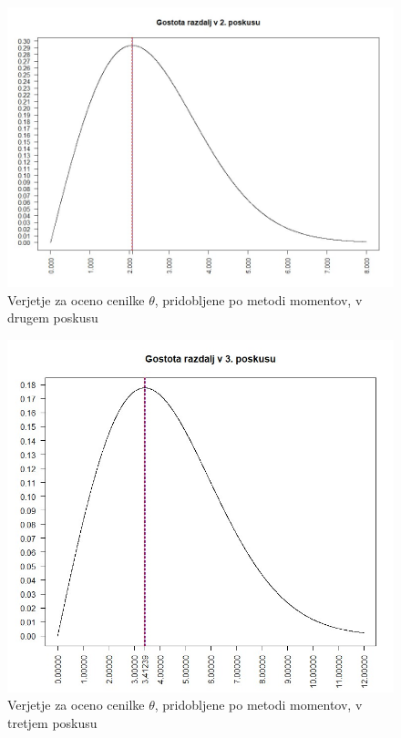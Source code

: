 \documentclass[a4paper, 10pt]{article}
\begin{document}
	\begin{figure}[h!]
		\label{fig: 2Eplot2}
		\centering
		\includegraphics[scale = 0.325]{VerjetjeMM2}
		\caption{Verjetje za oceno cenilke $\theta$, pridobljene po metodi momentov, v drugem poskusu}
	\end{figure}
	
	\begin{figure}[h!]
		\label{fig: 2Eplot3}
		\centering
		\includegraphics[scale = 0.35]{VerjetjeMM3}
		\caption{Verjetje za oceno cenilke $\theta$, pridobljene po metodi momentov, v tretjem poskusu}
	\end{figure}
	
\end{document}
